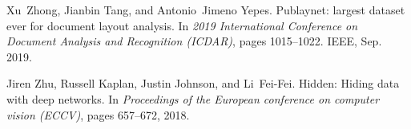 \documentclass{article}
\begin{document}
\begin{thebibliography}{}
	Xu~Zhong, Jianbin Tang, and Antonio~Jimeno Yepes.
	\newblock Publaynet: largest dataset ever for document layout analysis.
	\newblock In {\em 2019 International Conference on Document Analysis and
		Recognition (ICDAR)}, pages 1015--1022. IEEE, Sep. 2019.
	
	Jiren Zhu, Russell Kaplan, Justin Johnson, and Li~Fei-Fei.
	\newblock Hidden: Hiding data with deep networks.
	\newblock In {\em Proceedings of the European conference on computer vision
		(ECCV)}, pages 657--672, 2018.
	
\end{thebibliography}

%
%
\end{document}
